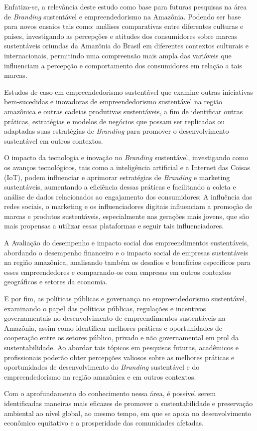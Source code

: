 Enfatiza-se, a relevância deste estudo como base para futuras pesquisas na área de \textit{Branding} sustentável e empreendedorismo na Amazônia. Podendo ser base para novos ensaios tais como: análises comparativas entre diferentes culturas e países, investigando as percepções e atitudes dos consumidores sobre marcas sustentáveis oriundas da Amazônia do Brasil em diferentes contextos culturais e internacionais, permitindo uma compreensão mais ampla das variáveis que influenciam a percepção e comportamento dos consumidores em relação a tais marcas.

Estudos de caso em empreendedorismo sustentável que examine outras iniciativas bem-sucedidas e inovadoras de empreendedorismo sustentável na região amazônica e outras cadeias produtivas sustentáveis, a fim de identificar outras práticas, estratégias e modelos de negócios que possam ser replicadas ou adaptadas suas estratégias de \textit{Branding} para promover o desenvolvimento sustentável em outros contextos.

O impacto da tecnologia e inovação no \textit{Branding} sustentável, investigando como os avanços tecnológicos, tais como a inteligência artificial e a Internet das Coisas (IoT), podem influenciar e aprimorar estratégias de \textit{Branding} e marketing sustentáveis, aumentando a eficiência dessas práticas e facilitando a coleta e análise de dados relacionados ao engajamento dos consumidores;
A influência das redes sociais, o marketing e os influenciadores digitais influenciam a promoção de marcas e produtos sustentáveis, especialmente nas gerações mais jovens, que são mais propensas a utilizar essas plataformas e seguir tais influenciadores.

A Avaliação do desempenho e impacto social dos empreendimentos sustentáveis, abordando o desempenho financeiro e o impacto social de empresas sustentáveis na região amazônica, analisando também os desafios e benefícios específicos para esses empreendedores e comparando-os com empresas em outros contextos geográficos e setores da economia.

E por fim, as políticas públicas e governança no empreendedorismo sustentável, examinando o papel das políticas públicas, regulações e incentivos governamentais no desenvolvimento de empreendimentos sustentáveis na Amazônia, assim como identificar melhores práticas e oportunidades de cooperação entre os setores público, privado e não governamental em prol da sustentabilidade.
Ao abordar tais tópicos em pesquisas futuras, acadêmicos e profissionais poderão obter percepções valiosos sobre as melhores práticas e oportunidades de desenvolvimento do \textit{Branding} sustentável e do empreendedorismo na região amazônica e em outros contextos.
 

Com o aprofundamento do conhecimento nessa área, é possível serem identificadas maneiras mais eficazes de promover a sustentabilidade e preservação ambiental ao nível global, ao mesmo tempo, em que se apoia no desenvolvimento econômico equitativo e a prosperidade das comunidades afetadas.


